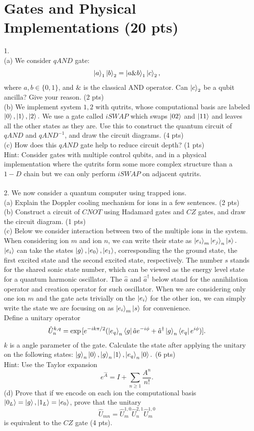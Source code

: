 \documentclass[12pt]{article}
\begin{document}
\section{Gates and Physical Implementations (20 pts)}
1.\\
(a) We consider $qAND$ gate:
\[\ket a_1 \ket b_2=\ket{a \& b}_1\ket c_2, \]
where $a,b\in\{0,1\}$, and $\&$ is the classical AND operator. Can $\ket c_2$ be a qubit ancilla? Give your reason. (2 pts)\\
(b) We implement system $1,2$ with qutrits, whose computational basis are labeled $\ket 0, \ket 1, \ket 2.$ We use a gate called $iSWAP$ which swaps $\ket{02}$ and $\ket{11}$ and leaves all the other states as they are. Use this to construct the quantum circuit of $qAND$ and $qAND^{-1}$, and draw the circuit diagrams. (4 pts)\\
(c) How does this $qAND$ gate help to reduce circuit depth? (1 pts)\\
Hint: Consider gates with multiple control qubits, and in a physical implementation where the qutrits form some more complex structure than a $1-D$ chain but we can only perform $iSWAP$ on adjacent qutrits.\\ \\
2. We now consider a quantum computer using trapped ions. \\
(a) Explain the Doppler cooling mechanism for ions in a few sentences. (2 pts)\\
(b) Construct a circuit of $CNOT$ using Hadamard gates and $CZ$ gates, and draw the circuit diagram. (1 pts)\\
(c) Below we consider interaction between two of the multiple ions in the system. When considering ion $m$ and ion $n$, we can write their state as $\ket {e_i}_m \ket{e_j}_n\ket{s}. $ $\ket {e_i}$ can take the states $\ket g,\ket{e_0},\ket{e_1}$, corresponding the the ground state, the first excited state and the second excited state, respectively. The number $s$ stands for the shared sonic state number, which can be viewed as the energy level state for a quantum harmonic oscillator. The $\hat a$ and $\hat a^\dagger$ below stand for the annihilation operator and creation operator for such oscillator. When we are considering only one ion $m$ and the gate acts trivially on the $\ket {e_i}$ for the other ion, we can simply write the state we are focusing on as $\ket {e_i}_m \ket{s}$ for convenience. \\
Define a unitary operator
\[\hat U_{n}^{k,q}=\exp{[e^{-ik\pi /2}(\ket{e_q}_n\bra{g}\hat ae^{-i\phi}+\hat a^{\dagger}\ket{g}_n\bra{e_q}e^{i\phi})]}.\]
$k$ is a angle parameter of the gate. 
Calculate the state after applying the unitary on the following states: $\ket g_n\ket 0, \ket g_n\ket 1, \ket {e_q}_n\ket 0.$ (6 pts)\\
Hint: Use the Taylor expansion
\[e^{\hat A}=I+\sum_{n\geq 1}\frac{A^n}{n!}.\]
(d) Prove that if we encode on each ion the computational basis $\ket{0_L}=\ket{g}, \ket{1_L}=\ket{e_0}$, prove that the unitary
\[\hat U_{mn}=\hat U_m^{1,0}\hat U_n^{2,1}\hat U_m^{1,0}\]
is equivalent to the $CZ$ gate (4 pts).\\
\end{document}
